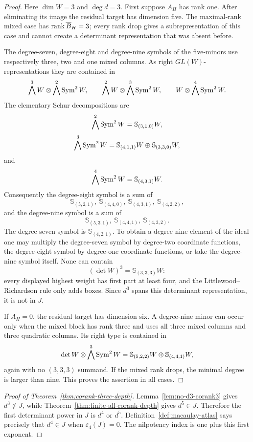 \begin{proof}
Here \(\dim W=3\) and \(\deg d=3\).  First suppose
\(A_H\) has rank one.  After eliminating its image the residual target
has dimension five.  The maximal-rank mixed case has
\(\operatorname{rank}\overline B_H=3\); every rank drop gives a subrepresentation of
this case and cannot create a determinant representation that was
absent before.

The degree-seven, degree-eight and degree-nine symbols of the
five-minors use respectively three, two and one mixed columns.  As
right \(GL(W)\)-representations they are contained in
\[
 \bigwedge^3W\otimes\bigwedge^2\operatorname{Sym}^2W,\qquad
 \bigwedge^2W\otimes\bigwedge^3\operatorname{Sym}^2W,\qquad
 W\otimes\bigwedge^4\operatorname{Sym}^2W.
\]
The elementary Schur decompositions are
\[
 \bigwedge^2\operatorname{Sym}^2W=\mathbb S_{(3,1,0)}W,
\]
\[
 \bigwedge^3\operatorname{Sym}^2W=
 \mathbb S_{(4,1,1)}W\oplus
 \mathbb S_{(3,3,0)}W,
\]
and
\[
 \bigwedge^4\operatorname{Sym}^2W=\mathbb S_{(4,3,1)}W.
\]
Consequently the degree-eight symbol is a sum of
\[
 \mathbb S_{(5,2,1)},\
 \mathbb S_{(4,4,0)},\
 \mathbb S_{(4,3,1)},\
 \mathbb S_{(4,2,2)},
\]
and the degree-nine symbol is a sum of
\[
 \mathbb S_{(5,3,1)},\
 \mathbb S_{(4,4,1)},\
 \mathbb S_{(4,3,2)}.
\]
The degree-seven symbol is
\(\mathbb S_{(4,2,1)}\).
To obtain a degree-nine element of the ideal one may multiply the
degree-seven symbol by degree-two coordinate functions, the
degree-eight symbol by degree-one coordinate functions, or take the
degree-nine symbol itself.  None can contain
\[
 (\det W)^3=\mathbb S_{(3,3,3)}W:
\]
every displayed highest weight has first part at least four, and the
Littlewood--Richardson rule only adds boxes.  Since \(d^3\) spans
this determinant representation, it is not in \(J\).

If \(A_H=0\), the residual target has dimension six.  A degree-nine
minor can occur only when the mixed block has rank three and uses all
three mixed columns and three quadratic columns.  Its right type is
contained in
\[
 \det W\otimes\bigwedge^3\operatorname{Sym}^2W
 =
 \mathbb S_{(5,2,2)}W
 \oplus
 \mathbb S_{(4,4,1)}W,
\]
again with no \((3,3,3)\) summand.  If the mixed rank drops, the
minimal degree is larger than nine.  This proves the assertion in all
cases.
\end{proof}

\begin{proof}[Proof of Theorem~\ref{thm:corank-three-depth}]
Lemma~\ref{lem:no-d3-corank3} gives \(d^3\notin J\), while
Theorem~\ref{thm:finite-all-corank-depth} gives \(d^5\in J\).
Therefore the first determinant power in \(J\) is \(d^4\) or \(d^5\).
Definition~\ref{def:macaulay-atlas} says precisely that
\(d^4\in J\) when \(\varepsilon_4(J)=0\).  The nilpotency index is
one plus this first exponent.
\end{proof}

